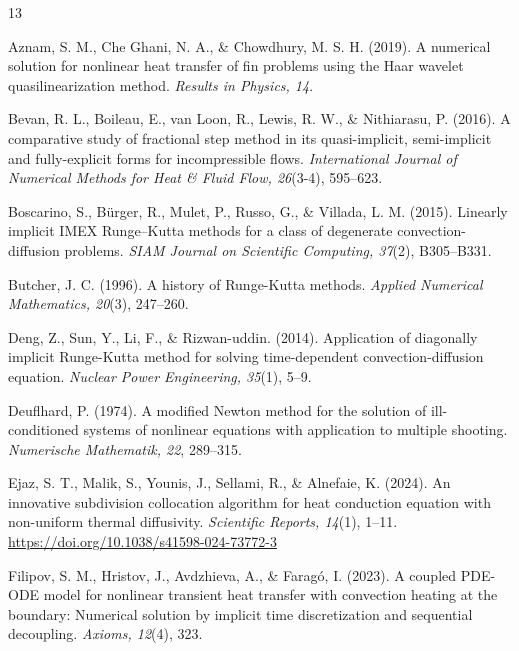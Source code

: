 \documentclass[final,5p,times,twocolumn,authoryear,11pt]{elsarticle}
\begin{document}
\begin{thebibliography}{13}

Aznam, S. M., Che Ghani, N. A., \& Chowdhury, M. S. H. (2019). A numerical solution for nonlinear heat transfer of fin problems using the Haar wavelet quasilinearization method. \textit{Results in Physics, 14}. 

Bevan, R. L., Boileau, E., van Loon, R., Lewis, R. W., \& Nithiarasu, P. (2016). A comparative study of fractional step method in its quasi-implicit, semi-implicit and fully-explicit forms for incompressible flows. \textit{International Journal of Numerical Methods for Heat \& Fluid Flow, 26}(3-4), 595--623.

Boscarino, S., B{\"u}rger, R., Mulet, P., Russo, G., \& Villada, L. M. (2015). Linearly implicit IMEX Runge--Kutta methods for a class of degenerate convection-diffusion problems. \textit{SIAM Journal on Scientific Computing, 37}(2), B305--B331.

Butcher, J. C. (1996). A history of Runge-Kutta methods. \textit{Applied Numerical Mathematics, 20}(3), 247--260.

Deng, Z., Sun, Y., Li, F., \& Rizwan-uddin. (2014). Application of diagonally implicit Runge-Kutta method for solving time-dependent convection-diffusion equation. \textit{Nuclear Power Engineering, 35}(1), 5--9. 

Deuflhard, P. (1974). A modified Newton method for the solution of ill-conditioned systems of nonlinear equations with application to multiple shooting. \textit{Numerische Mathematik, 22}, 289--315.

Ejaz, S. T., Malik, S., Younis, J., Sellami, R., \& Alnefaie, K. (2024). An innovative subdivision collocation algorithm for heat conduction equation with non-uniform thermal diffusivity. \textit{Scientific Reports, 14}(1), 1--11. \url{https://doi.org/10.1038/s41598-024-73772-3}

Filipov, S. M., Hristov, J., Avdzhieva, A., \& Farag{\'o}, I. (2023). A coupled PDE-ODE model for nonlinear transient heat transfer with convection heating at the boundary: Numerical solution by implicit time discretization and sequential decoupling. \textit{Axioms, 12}(4), 323.


\end{thebibliography}
\end{document}
